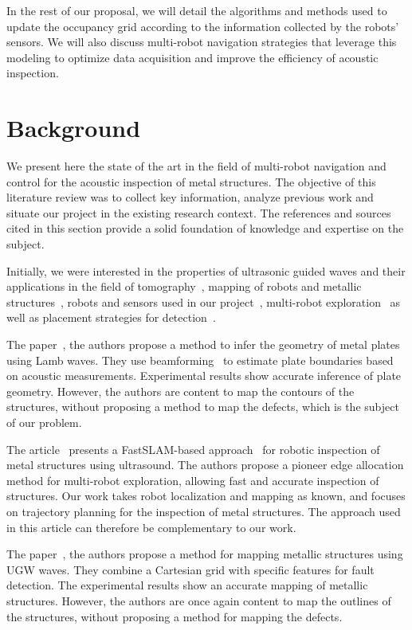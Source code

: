 In the rest of our proposal, we will detail the algorithms and methods used to update the occupancy grid according to the information collected by the robots' sensors.
We will also discuss multi-robot navigation strategies that leverage this modeling to optimize data acquisition and improve the efficiency of acoustic inspection.

\section{Background}

We present here the state of the art in the field of multi-robot navigation and control for the acoustic inspection of metal structures.
The objective of this literature review was to collect key information, analyze previous work and situate our project in the existing research context.
The references and sources cited in this section provide a solid foundation of knowledge and expertise on the subject.

Initially, we were interested in the properties of ultrasonic guided waves and their applications in the field of tomography~\cite{OUABI2022106705, HUTHWAITE2013979}, mapping of robots and metallic structures~\cite{9364359, 9811581 , inventions3030059, 9568841}, robots and sensors used in our project~\cite{s22093235}, multi-robot exploration~\cite{bautin:hal-00757960, articlesvsdf} as well as placement strategies for detection~\cite{article455556, 7487624, 7139673}.

The paper~\cite{OUABI2022106705}, the authors propose a method to infer the geometry of metal plates using Lamb waves.
They use beamforming~\cite{enwiki:1151960654} to estimate plate boundaries based on acoustic measurements.
Experimental results show accurate inference of plate geometry.
However, the authors are content to map the contours of the structures, without proposing a method to map the defects, which is the subject of our problem.

The article~\cite{9364359} presents a FastSLAM-based approach~\cite{article254524} for robotic inspection of metal structures using ultrasound.
The authors propose a pioneer edge allocation method for multi-robot exploration, allowing fast and accurate inspection of structures.
Our work takes robot localization and mapping as known, and focuses on trajectory planning for the inspection of metal structures.
The approach used in this article can therefore be complementary to our work.

The paper~\cite{9811581}, the authors propose a method for mapping metallic structures using UGW waves.
They combine a Cartesian grid with specific features for fault detection.
The experimental results show an accurate mapping of metallic structures.
However, the authors are once again content to map the outlines of the structures, without proposing a method for mapping the defects.

